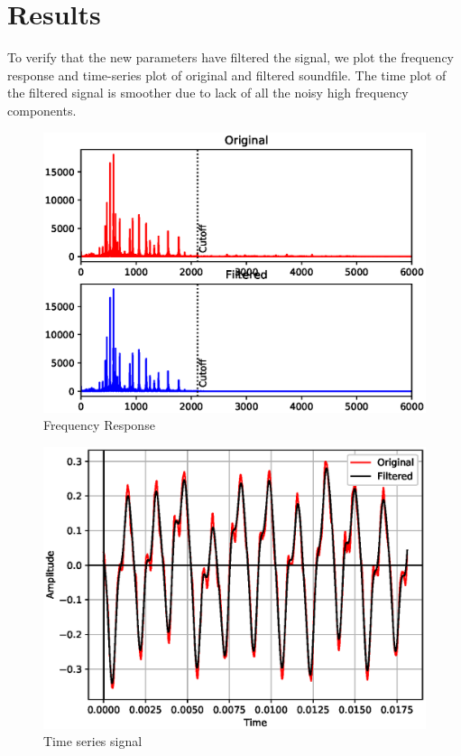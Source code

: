 \documentclass[journal,12pt,twocolumn]{IEEEtran}
\begin{document}
\section{\textbf{Results}}
To verify that the new parameters have filtered the signal, we plot the frequency response and time-series plot of original and filtered soundfile. The time plot of the filtered signal is smoother due to lack of all the noisy high frequency components.
\begin{figure}[!h]
\centering
\includegraphics[width=1.2\columnwidth]{./figs/ee18btech11051_freq_result.eps}
\caption{Frequency Response}
\label{fig:Figure1}
\end{figure}

\begin{figure}[!h]
\centering
\includegraphics[width=1.2\columnwidth]{./figs/ee18btech11051_time_result.eps}
\caption{Time series signal}
\label{fig:Figure2}
\end{figure}
\end{document}
